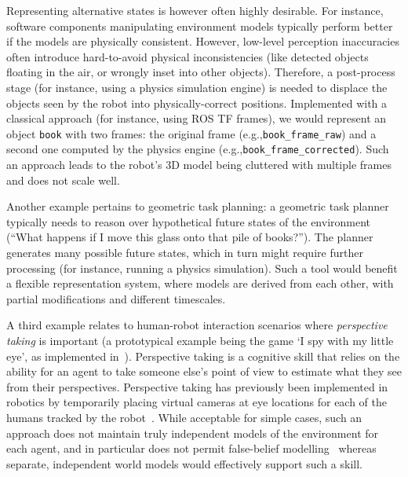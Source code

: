 \documentclass[letterpaper, 10pt, conference]{ieeeconf}
\newcommand{\eg}{e.g.,\xspace}
\begin{document}
Representing alternative states is however often highly desirable. For instance,
software components manipulating environment models typically perform better if
the models are physically consistent. However, low-level perception inaccuracies
often introduce hard-to-avoid physical inconsistencies (like detected objects
floating in the air, or wrongly inset into other objects).
Therefore, a post-process stage (for instance, using a physics simulation
engine) is needed to displace the objects seen by the robot into
physically-correct positions. Implemented with a classical approach (for
instance, using ROS TF frames), we would represent an object {\tt book} with two
frames: the original frame (\eg {\tt book\_frame\_raw}) and a second one
computed by the physics engine (\eg {\tt book\_frame\_corrected}). Such an
approach leads to the robot's 3D model being cluttered with multiple frames and
does not scale well.

Another example pertains to geometric task planning: a geometric task planner
typically needs to reason over hypothetical future states of the environment
(``What happens if I move this glass onto that pile of books?'').  The planner
generates many possible future states, which in turn might require further
processing (for instance, running a physics simulation). Such a tool would
benefit a flexible representation system, where models are derived from each
other, with partial modifications and different timescales.

A third example relates to human-robot interaction scenarios where \emph{perspective
taking} is important (a prototypical example being the game `I spy with my
little eye', as implemented in~\cite{ros2010which}). Perspective taking is a
cognitive skill that relies on the ability for an agent to take someone else's
point of view to estimate what they see from their perspectives. 
Perspective taking has previously been implemented in robotics by temporarily placing
virtual cameras at eye locations for each of the humans tracked by the
robot~\cite{ros2010solving}. While acceptable for simple cases, such an approach
does not maintain truly independent models of the environment for each
agent, and in particular does not permit false-belief
modelling~\cite{lemaignan2015mutual} whereas separate, independent world models
would effectively support such a skill.
\end{document}
